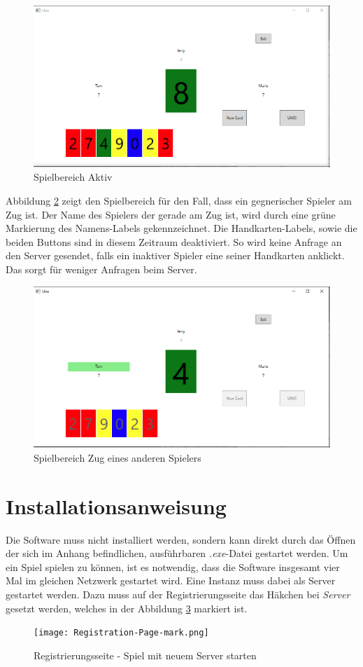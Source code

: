 \begin{figure}[h]
	\begin{center}
		\includegraphics[width=0.6\linewidth]{bilder/Game-Page active.png}
		\caption{Spielbereich Aktiv}
		\label{fig:gameactive}
	\end{center}
\end{figure}
Abbildung \ref{fig:gamedeactive} zeigt den Spielbereich für den Fall, dass ein gegnerischer Spieler am Zug ist. Der Name des Spielers der gerade am Zug ist, wird durch eine grüne Markierung des Namens-Labels gekennzeichnet. Die Handkarten-Labels, sowie die beiden Buttons sind in diesem Zeitraum deaktiviert. So wird keine Anfrage an den Server gesendet, falls ein inaktiver Spieler eine seiner Handkarten anklickt. Das sorgt für weniger Anfragen beim Server. 
\begin{figure}[h]
	\begin{center}
		\includegraphics[width=0.6\linewidth]{bilder/Game-Page.png}
		\caption{Spielbereich Zug eines anderen Spielers}
		\label{fig:gamedeactive}
	\end{center}
\end{figure}


\section{Installationsanweisung}
Die Software muss nicht installiert werden, sondern kann direkt durch das Öffnen der sich im Anhang befindlichen, ausführbaren \textit{.exe}-Datei gestartet werden. Um ein Spiel spielen zu können, ist es notwendig, dass die Software insgesamt vier Mal im gleichen Netzwerk gestartet wird. Eine Instanz muss dabei als Server gestartet werden. Dazu muss auf der Registrierungsseite das Häkchen bei \textit{Server} gesetzt werden, welches in der Abbildung \ref{fig:regipage-mark} markiert ist.
\begin{figure}[h]
	\begin{center}
		\texttt{[image: Registration-Page-mark.png]}
		\caption{Registrierungsseite - Spiel mit neuem Server starten}
		\label{fig:regipage-mark}
	\end{center}
\end{figure}


